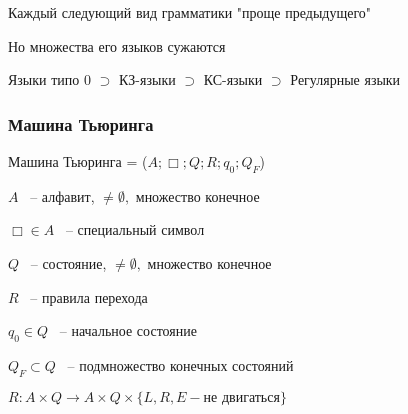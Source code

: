 \documentclass[russian]{lecture-notes}
\begin{document}
\begin{remark}
	Каждый следующий вид грамматики "проще предыдущего"
	
	Но множества его языков сужаются
	
	Языки типо 0 $\supset$ КЗ-языки $\supset$ КС-языки $\supset$ Регулярные языки
\end{remark}

\subsubsection{Машина Тьюринга}

\begin{definition}
	Машина Тьюринга = ($A; \Box; Q; R; q_0; Q_F$)
	
	$A$ ~-- алфавит, $\neq \emptyset,$ множество конечное
	
	$\Box \in A$ ~-- специальный символ
	
	$Q$ ~-- состояние, $\neq \emptyset,$ множество конечное

	$R$ ~-- правила перехода
	
	$q_0 \in Q$ ~-- начальное состояние
	
	$Q_F \subset Q$ ~-- подмножество конечных состояний 
	
	$R: A \times Q \rightarrow A \times Q \times \{ L, R, E - \textrm{не двигаться}\}$
\end{definition}
\end{document}
